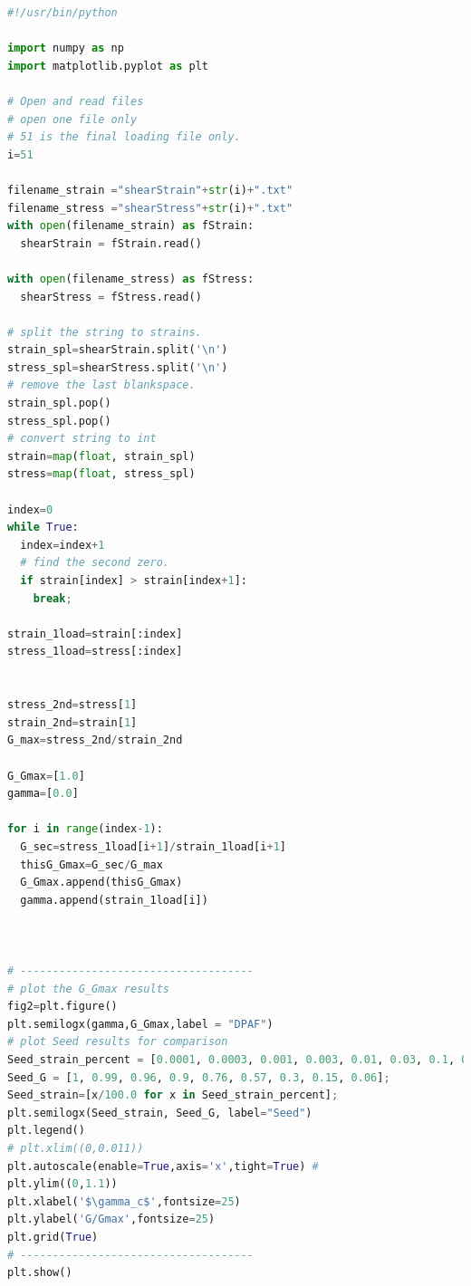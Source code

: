 \documentclass[fleqn,11pt]{article}
\begin{document}
\begin{lstlisting}[language=python, frame=single]  
#!/usr/bin/python

import numpy as np
import matplotlib.pyplot as plt

# Open and read files 
# open one file only 
# 51 is the final loading file only.
i=51

filename_strain ="shearStrain"+str(i)+".txt"
filename_stress ="shearStress"+str(i)+".txt"
with open(filename_strain) as fStrain:
  shearStrain = fStrain.read()

with open(filename_stress) as fStress:
  shearStress = fStress.read()

# split the string to strains.
strain_spl=shearStrain.split('\n')
stress_spl=shearStress.split('\n')
# remove the last blankspace.
strain_spl.pop()
stress_spl.pop()
# convert string to int
strain=map(float, strain_spl)
stress=map(float, stress_spl)

index=0
while True:
  index=index+1
  # find the second zero.
  if strain[index] > strain[index+1]:
    break;

strain_1load=strain[:index]
stress_1load=stress[:index]


stress_2nd=stress[1]
strain_2nd=strain[1]
G_max=stress_2nd/strain_2nd

G_Gmax=[1.0]
gamma=[0.0]

for i in range(index-1):
  G_sec=stress_1load[i+1]/strain_1load[i+1]
  thisG_Gmax=G_sec/G_max
  G_Gmax.append(thisG_Gmax)
  gamma.append(strain_1load[i]) 



# ------------------------------------
# plot the G_Gmax results
fig2=plt.figure()
plt.semilogx(gamma,G_Gmax,label = "DPAF")
# plot Seed results for comparison
Seed_strain_percent = [0.0001, 0.0003, 0.001, 0.003, 0.01, 0.03, 0.1, 0.3, 1.0];
Seed_G = [1, 0.99, 0.96, 0.9, 0.76, 0.57, 0.3, 0.15, 0.06];
Seed_strain=[x/100.0 for x in Seed_strain_percent];
plt.semilogx(Seed_strain, Seed_G, label="Seed")
plt.legend()
# plt.xlim((0,0.011))
plt.autoscale(enable=True,axis='x',tight=True) #
plt.ylim((0,1.1))
plt.xlabel('$\gamma_c$',fontsize=25)
plt.ylabel('G/Gmax',fontsize=25)
plt.grid(True)
# ------------------------------------
plt.show()
\end{lstlisting}
















\nocite{*}






\end{document}
